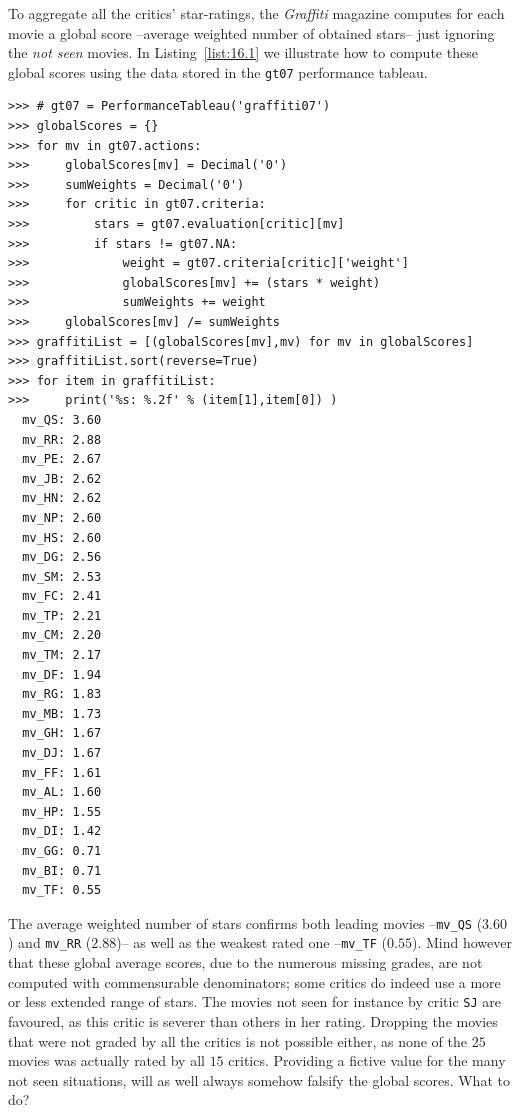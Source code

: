 To aggregate all the critics' star-ratings, the \emph{Graffiti} magazine computes for each movie a global score --average weighted number of obtained stars-- just ignoring the \emph{not seen} movies. In Listing~\vref{list:16.1} we illustrate how to compute these global scores using the data stored in the \texttt{gt07} performance tableau.
\begin{lstlisting}[caption={Computing the average weighted number of stars per movie},label=list:16.1,basicstyle=\ttfamily\scriptsize]
>>> # gt07 = PerformanceTableau('graffiti07')
>>> globalScores = {}
>>> for mv in gt07.actions:
>>>     globalScores[mv] = Decimal('0')
>>>     sumWeights = Decimal('0')
>>>     for critic in gt07.criteria:
>>>         stars = gt07.evaluation[critic][mv]
>>>         if stars != gt07.NA:
>>>             weight = gt07.criteria[critic]['weight']
>>>             globalScores[mv] += (stars * weight)
>>>             sumWeights += weight
>>>     globalScores[mv] /= sumWeights
>>> graffitiList = [(globalScores[mv],mv) for mv in globalScores]
>>> graffitiList.sort(reverse=True)
>>> for item in graffitiList:
>>>     print('%s: %.2f' % (item[1],item[0]) )
  mv_QS: 3.60
  mv_RR: 2.88
  mv_PE: 2.67
  mv_JB: 2.62
  mv_HN: 2.62
  mv_NP: 2.60
  mv_HS: 2.60
  mv_DG: 2.56
  mv_SM: 2.53
  mv_FC: 2.41
  mv_TP: 2.21
  mv_CM: 2.20
  mv_TM: 2.17
  mv_DF: 1.94
  mv_RG: 1.83
  mv_MB: 1.73
  mv_GH: 1.67
  mv_DJ: 1.67
  mv_FF: 1.61
  mv_AL: 1.60
  mv_HP: 1.55
  mv_DI: 1.42
  mv_GG: 0.71
  mv_BI: 0.71
  mv_TF: 0.55
\end{lstlisting}

The average weighted number of stars confirms both leading movies --\texttt{mv\_QS} ($3.60$) and \texttt{mv\_RR} ($2.88$)-- as well as the weakest rated one --\texttt{mv\_TF} ($0.55$). Mind however that these global average scores, due to the numerous missing grades, are not computed with commensurable denominators; some critics do indeed use a more or less extended range of stars. The movies not seen for instance by critic \texttt{SJ} are favoured, as this critic is severer than others in her rating. Dropping the movies that were not graded by all the critics is not possible either, as none of the $25$ movies was actually rated by all $15$ critics. Providing a fictive value for the many not seen situations, will as well always somehow falsify the global scores. What to do?

